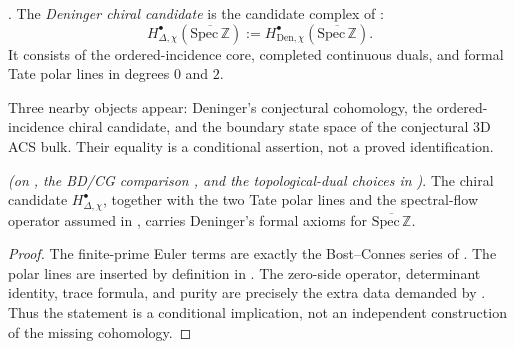 \begin{definition}
\label{v4-arith:w8-a:def:deninger-cohomology}
\ClaimStatusDefinitional. The \emph{Deninger chiral candidate} is the
candidate complex of :
\begin{equation}
\label{v4-arith:w8-a:eq:deninger-chiral-def}
H^\bullet_{\Delta,\chi}
(\overline{\mathrm{Spec}\,\mathbb Z})
:=
H^\bullet_{\mathrm{Den},\chi}
(\overline{\mathrm{Spec}\,\mathbb Z}).
\end{equation}
It consists of the ordered-incidence core, completed continuous duals,
and formal Tate polar lines in degrees \(0\) and \(2\).
\end{definition}

\begin{remark}
\label{v4-arith:w8-a:rem:three-labels}
Three nearby objects appear: Deninger's conjectural cohomology,
the ordered-incidence chiral candidate, and the boundary state space of
the conjectural 3D ACS bulk. Their equality is a conditional assertion,
not a proved identification.
\end{remark}

\begin{proposition}
\label{v4-arith:w8-a:thm:deninger-chiral-equals}
\ClaimStatusProvedHereConditional \emph{(on
, the BD/CG comparison
, and the
topological-dual choices in
)}. The chiral
candidate \(H^\bullet_{\Delta,\chi}\), together with the two Tate polar
lines and the spectral-flow operator assumed in
, carries Deninger's formal
axioms for \(\overline{\mathrm{Spec}\,\mathbb Z}\).
\end{proposition}

\begin{proof}
The finite-prime Euler terms are exactly the Bost--Connes series of
. The polar lines are
inserted by definition in
. The zero-side
operator, determinant identity, trace formula, and purity are precisely
the extra data demanded by
. Thus the statement is a
conditional implication, not an independent construction of the missing
cohomology.
\end{proof}

